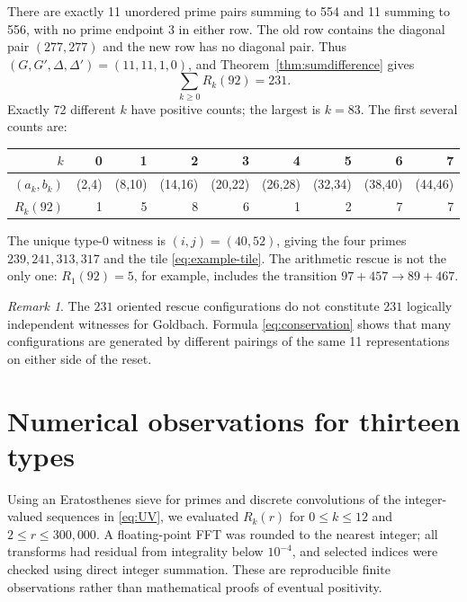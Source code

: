 \documentclass[11pt,a4paper]{article}
\theoremstyle{definition}
\theoremstyle{remark}
\newtheorem{remark}[theorem]{Remark}
\begin{document}
There are exactly 11 unordered prime pairs summing to 554 and 11 summing to 556, with no prime endpoint $3$ in either row.  The old row contains the diagonal pair $(277,277)$ and the new row has no diagonal pair.  Thus $(G,G',\Delta,\Delta')=(11,11,1,0)$, and Theorem~\ref{thm:sumdifference} gives
\begin{equation}
 \boxed{\displaystyle\sum_{k\ge0}R_k(92)=231.}
\end{equation}
Exactly 72 different $k$ have positive counts; the largest is $k=83$.  The first several counts are:
\begin{center}
\begin{tabular}{rrrrrrrrr}
\toprule
$k$&0&1&2&3&4&5&6&7\\
\midrule
$(a_k,b_k)$&(2,4)&(8,10)&(14,16)&(20,22)&(26,28)&(32,34)&(38,40)&(44,46)\\
$R_k(92)$&1&5&8&6&1&2&7&7\\
\bottomrule
\end{tabular}
\end{center}
The unique type-0 witness is $(i,j)=(40,52)$, giving the four primes $239,241,313,317$ and the tile \eqref{eq:example-tile}. The arithmetic rescue is not the only one: $R_1(92)=5$, for example, includes the transition $97+457\to89+467$.

\begin{remark}
The $231$ oriented rescue configurations do not constitute $231$ logically independent witnesses for Goldbach. Formula \eqref{eq:conservation} shows that many configurations are generated by different pairings of the same 11 representations on either side of the reset.
\end{remark}

\section{Numerical observations for thirteen types}
Using an Eratosthenes sieve for primes and discrete convolutions of the integer-valued sequences in \eqref{eq:UV}, we evaluated $R_k(r)$ for $0\le k\le12$ and $2\le r\le300{,}000$. A floating-point FFT was rounded to the nearest integer; all transforms had residual from integrality below $10^{-4}$, and selected indices were checked using direct integer summation. These are reproducible finite observations rather than mathematical proofs of eventual positivity.
\end{document}
